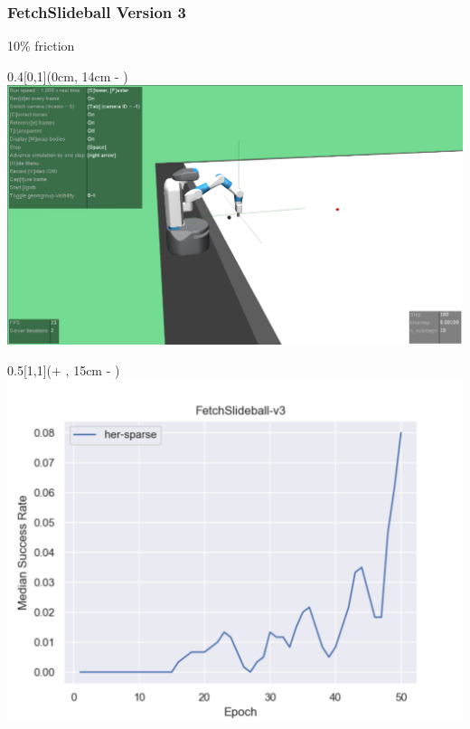 





\begin{frame}
	\frametitle{FetchSlideball Version 3}	
	\vspace{1cm}
	
	10\% friction
	
	\begin{textblock*}{0.4\paperwidth}[0,1](0cm, 14cm - \PraesentationSeitenrand)%
		\includegraphics[width=0.4\paperwidth]{./Ressourcen/Figures/FetchSlideball-v3.pdf}
	\end{textblock*}
	
	\begin{textblock*}{0.5\paperwidth}[1,1](\textwidth + \PraesentationSeitenrand, 15cm - \PraesentationSeitenrand)%
		\includegraphics[width=0.5\paperwidth]{./Ressourcen/Figures/fig_FetchSlideball-v3.pdf}
	\end{textblock*}
	
	
\end{frame}
\clearpage

